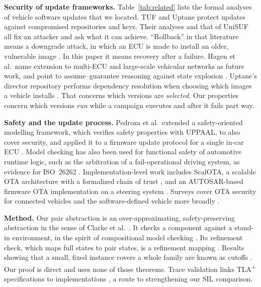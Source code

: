 \documentclass[journal]{IEEEtran}
\newcommand{\tla}{TLA\textsuperscript{+}}
\begin{document}
\textbf{Security of update frameworks.} Table~\ref{tab:related} lists the formal analyses of vehicle software updates that we located. TUF \cite{samuel2010} and Uptane \cite{kuppusamy2016,kuppusamy2018} protect updates against compromised repositories and keys. Their analyses \cite{mahmood2020,mahmood2022,kirk2021,kirk2023,boureanu2023,lorch2024} and that of UniSUF \cite{hagen2026} all fix an attacker and ask what it can achieve. ``Rollback'' in that literature means a downgrade attack, in which an ECU is made to install an older, vulnerable image \cite{kuppusamy2016,lorch2024}. In this paper it means recovery after a failure. Hagen et al.\ name extension to multi-ECU and large-scale vehicular networks as future work, and point to assume--guarantee reasoning against state explosion \cite{hagen2026}. Uptane's director repository performs dependency resolution when choosing which images a vehicle installs \cite{kuppusamy2018}. That concerns which versions are \emph{selected}. Our properties concern which versions \emph{run} while a campaign executes and after it fails part way.

\textbf{Safety and the update process.} Pedroza et al.\ extended a safety-oriented modelling framework, which verifies safety properties with UPPAAL, to also cover security, and applied it to a firmware update protocol for a single in-car ECU \cite{pedroza2011,idrees2011}. Model checking has also been used for functional safety of automotive runtime logic, such as the arbitration of a fail-operational driving system, as evidence for ISO~26262 \cite{schmid2021}. Implementation-level work includes ScalOTA, a scalable OTA architecture with a formalized chain of trust \cite{shoker2023}, and an AUTOSAR-based firmware OTA implementation on a steering system \cite{mostafa2025}. Surveys cover OTA security for connected vehicles \cite{li2024} and the software-defined vehicle more broadly \cite{liotou2026}.

\textbf{Method.} Our pair abstraction is an over-approximating, safety-preserving abstraction in the sense of Clarke et al.\ \cite{clarke1994}. It checks a component against a stand-in environment, in the spirit of compositional model checking \cite{clarke1989}. Its refinement check, which maps full states to pair states, is a refinement mapping \cite{abadi1991}. Results showing that a small, fixed instance covers a whole family are known as cutoffs \cite{emerson1995}. Our proof is direct and uses none of those theorems. Trace validation links \tla{} specifications to implementations \cite{cirstea2024,howard2024}, a route to strengthening our SIL comparison.
\end{document}
